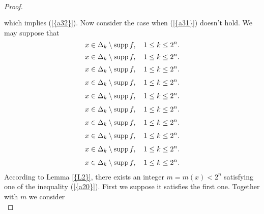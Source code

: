 \documentclass{amsart}
\numberwithin{equation}{section}
\begin{document}
\begin{proof}
{\begin{multline}
\begin{split}
\end{split}\end{multline}\fi
}
which implies {(\ref{{a32}})}. Now consider the case when {(\ref{{a31}})} doesn't hold. We may suppose that
{
\begin{equation*} \label{a22}
x\in \Delta_k\setminus {{\rm supp\,}} f,\quad 1\le k\le 2^n.
 \end{equation*}\fi  
{}\begin{equation}\label{a22}
x\in \Delta_k\setminus {{\rm supp\,}} f,\quad 1\le k\le 2^n.
\end{equation}\fi   
{}\begin{align*}\label{a22}
x\in \Delta_k\setminus {{\rm supp\,}} f,\quad 1\le k\le 2^n.
\end{align*}\fi   
{}\begin{align}\label{a22}
x\in \Delta_k\setminus {{\rm supp\,}} f,\quad 1\le k\le 2^n.
\end{align}\fi    
{}\begin{gather*}\label{a22}
x\in \Delta_k\setminus {{\rm supp\,}} f,\quad 1\le k\le 2^n.
\end{gather*}\fi  
{}\begin{gather}\label{a22}
x\in \Delta_k\setminus {{\rm supp\,}} f,\quad 1\le k\le 2^n.
\end{gather}\fi   
{}\begin{multline*}\label{a22}
x\in \Delta_k\setminus {{\rm supp\,}} f,\quad 1\le k\le 2^n.
\end{multline*}\fi  
{}\begin{multline}\label{a22}
x\in \Delta_k\setminus {{\rm supp\,}} f,\quad 1\le k\le 2^n.
\end{multline}\fi  
{}\begin{multline*}\begin{split}\label{a22}
x\in \Delta_k\setminus {{\rm supp\,}} f,\quad 1\le k\le 2^n.
\end{split}\end{multline*}\fi
{}\begin{multline}\begin{split}\label{a22}
x\in \Delta_k\setminus {{\rm supp\,}} f,\quad 1\le k\le 2^n.
\end{split}\end{multline}\fi
}
According to {Lemma \ref{{L2}}}, there exists an integer $m=m(x)<2^n$ satisfying one of the inequality {(\ref{{a20}})}. First we suppose it satisfies the first one.
Together with $m$ we consider
{
\begin{equation*} 

\end{equation*}}
\end{proof}
\end{document}
